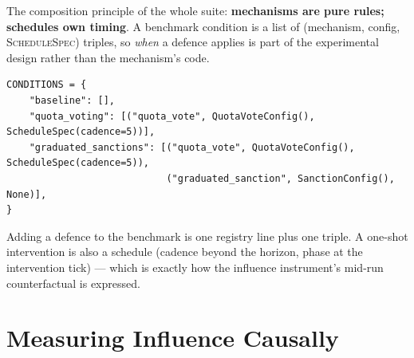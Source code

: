 \documentclass[11pt]{article}
\begin{document}
The composition principle of the whole suite: \textbf{mechanisms are pure rules; schedules
own timing}. A benchmark condition is a list of
(mechanism, config, \textsc{ScheduleSpec}) triples, so \emph{when} a defence applies is part
of the experimental design rather than the mechanism's code.

\begin{center}
\end{center}

\begin{lstlisting}
CONDITIONS = {
    "baseline": [],
    "quota_voting": [("quota_vote", QuotaVoteConfig(), ScheduleSpec(cadence=5))],
    "graduated_sanctions": [("quota_vote", QuotaVoteConfig(), ScheduleSpec(cadence=5)),
                            ("graduated_sanction", SanctionConfig(), None)],
}
\end{lstlisting}

\noindent Adding a defence to the benchmark is one registry line plus one triple. A one-shot
intervention is also a schedule (cadence beyond the horizon, phase at the intervention tick)
--- which is exactly how the influence instrument's mid-run counterfactual is expressed.

\section{Measuring Influence Causally}
\end{document}
